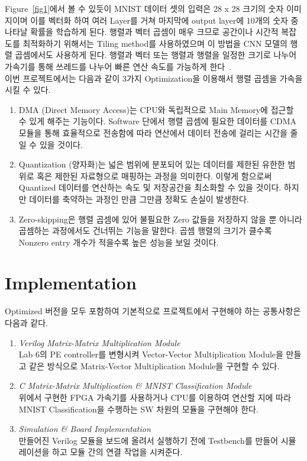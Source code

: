 \documentclass{article}
\begin{document}
Figure~\ref{fig1}에서 볼 수 있듯이 MNIST 데이터 셋의 입력은 28 x 28 크기의 숫자 이미지이며 이를 벡터화 하여 여러 Layer를 거쳐 마지막에 output layer에 10개의 숫자 중 나타날 확률을 학습하게 된다. 행렬과 벡터 곱셈이 매우 크므로 공간이나 시간적 복잡도를 최적화하기 위해서는 Tiling method를 사용하였으며 이 방법을 CNN 모델의 행렬 곱셈에서도 사용하게 된다. 행렬과 벡터 또는 행렬과 행렬을 일정한 크기로 나누어 가속기를 통해 쓰레드를 나누어 빠른 연산 속도를 가능하게 한다~\cite{lab9, crockett2014zynq, deng2012mnist}.\\

이번 프로젝트에서는 다음과 같이 3가지 Optimization을 이용해서 행렬 곱셈을 가속을 시킬 수 있다.
\begin{enumerate}
    \item DMA (Direct Memory Access)는 CPU와 독립적으로 Main Memory에 접근할 수 있게 해주는 기능이다. Software 단에서 행렬 곱셈에 필요한 데이터를 CDMA 모듈을 통해 효율적으로 전송함에 따라 연산에서 데이터 전송에 걸리는 시간을 줄일 수 있을 것이다.
    \item Quantization (양자화)는 넓은 범위에 분포되어 있는 데이터를 제한된 유한한 범위로 혹은 제한된 자료형으로 매핑하는 과정을 의미한다. 이렇게 함으로써 Quantized 데이터를 연산하는 속도 및 저장공간을 최소화할 수 있을 것이다. 하지만 데이터를 축약하는 과정인 만큼 그만큼 정확도 손실이 발생한다.
    \item Zero-skipping은 행렬 곱셈에 있어 불필요한 Zero 값들을 저장하지 않을 뿐 아니라 곱셈하는 과정에서도 건너뛰는 기능을 말한다. 곱셈 행렬의 크기가 클수록 Nonzero entry 개수가 적을수록 높은 성능을 보일 것이다.
\end{enumerate} 

\section{Implementation}
\label{sec:impl}
Optimized 버전을 모두 포함하여 기본적으로 프로젝트에서 구현해야 하는 공통사항은 다음과 같다.
\begin{enumerate}
    \item \textit{Verilog Matrix-Matrix Multiplication Module}\\
    Lab 6의 PE controller를 변형시켜 Vector-Vector Multiplication Module을 만들고 같은 방식으로 Matrix-Vector Multiplication Module을 구현할 수 있다.
    \item \textit{C Matrix-Matrix Multiplication \& MNIST Classification Module}\\
    위에서 구현한 FPGA 가속기를 사용하거나 CPU를 이용하여 연산할 지에 따라 MNIST Classification을 수행하는 SW 차원의 모듈을 구현해야 한다. 
    \item \textit{Simulation \& Board Implementation} \\
    만들어진 Verilog 모듈을 보드에 올려서 실행하기 전에 Testbench를 만들어 시뮬레이션을 하고 모듈 간의 연결 작업을 시켜준다.
\end{enumerate}
\end{document}
